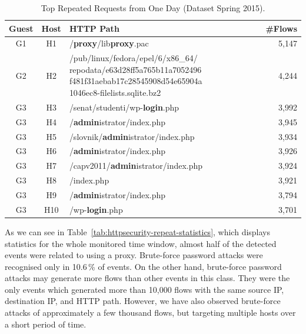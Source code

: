 \begin{table}[ht]
\centering
\begin{tabular}{| c | c | l | r|} \hline
Guest & Host & HTTP Path & \#Flows \\ \hline
G1  & H1 & /\textbf{proxy}/lib\textbf{proxy}.pac & 5,147 \\ \hline
G2  & H2 & \parbox[t]{6cm}{/pub/linux/fedora/epel/6/x86\_64/ repodata/e63d28ff5a765b11a7052496\\f481f31aebab17c28545908d54e65904a\\1046ec8-filelists.sqlite.bz2} & 4,244 \\ \hline
G3  & H3 & /senat/studenti/wp-\textbf{login}.php & 3,992 \\ \hline
G3  & H4 & /\textbf{admin}istrator/index.php & 3,945 \\ \hline
G3  & H5 & /slovnik/\textbf{admin}istrator/index.php & 3,934 \\ \hline
G3  & H6 & /\textbf{admin}istrator/index.php & 3,926 \\ \hline
G3  & H7 & /capv2011/\textbf{admin}istrator/index.php & 3,924 \\ \hline
G3  & H8 & /index.php & 3,921 \\ \hline
G3  & H9 & /\textbf{admin}istrator/index.php & 3,794 \\ \hline
G3  & H10 & /wp-\textbf{login}.php & 3,701 \\ \hline
\end{tabular}
\caption{Top Repeated Requests from One Day (Dataset Spring 2015).}
\label{tab:httpsecurity-repeat2}
\end{table}

As we can see in Table~\ref{tab:httpsecurity-repeat-statistics}, which displays statistics for the whole monitored time window, almost half of the detected events were related to using a proxy. Brute-force password attacks were recognised only in 10.6\,\% of events. On the other hand, brute-force password attacks may generate more flows than other events in this class. They were the only events which generated more than 10,000 flows with the same source IP, destination IP, and HTTP path. However, we have also observed brute-force attacks of approximately a few thousand flows, but targeting multiple hosts over a short period of time.

